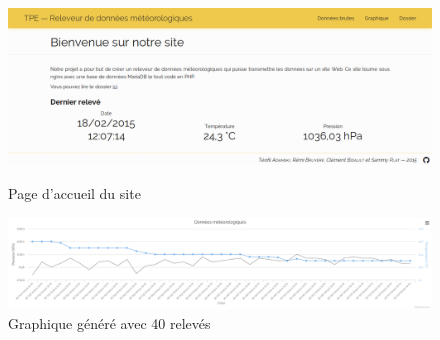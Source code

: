 \begin{figure}
	\centering
	\includegraphics[width=.7\linewidth]{Images/Accueil_finale}
	\caption{Page d'accueil du site}
	\vspace{1cm}
	\includegraphics[width=\linewidth]{Images/Graphique_final}
	\caption{Graphique généré avec 40 relevés}
\end{figure}
